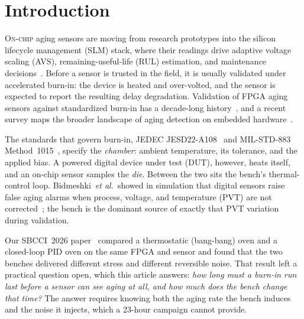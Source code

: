 \documentclass[10pt,twocolumn]{article}
\begin{document}
\section{Introduction}
\lettrine[lines=2,findent=1pt,nindent=0pt]{O}{n-chip} aging sensors are moving from research prototypes into the silicon lifecycle management (SLM) stack, where their readings drive adaptive voltage scaling (AVS), remaining-useful-life (RUL) estimation, and maintenance decisions~\cite{kashyap,niemann}. Before a sensor is trusted in the field, it is usually validated under accelerated burn-in: the device is heated and over-volted, and the sensor is expected to report the resulting delay degradation. Validation of FPGA aging sensors against standardized burn-in has a decade-long history~\cite{valdes}, and a recent survey maps the broader landscape of aging detection on embedded hardware~\cite{lanzieri}.

The standards that govern burn-in, JEDEC JESD22-A108~\cite{jedec} and MIL-STD-883 Method~1015~\cite{mil}, specify the \emph{chamber}: ambient temperature, its tolerance, and the applied bias. A powered digital device under test (DUT), however, heats itself, and an on-chip sensor samples the \emph{die}. Between the two sits the bench's thermal-control loop. Bidmeshki~\textit{et al.}\ showed in simulation that digital sensors raise false aging alarms when process, voltage, and temperature (PVT) are not corrected~\cite{bidmeshki}; the bench is the dominant source of exactly that PVT variation during validation.

Our SBCCI~2026 paper~\cite{sbcci26} compared a thermostatic (bang-bang) oven and a closed-loop PID oven on the same FPGA and sensor and found that the two benches delivered different stress and different reversible noise. That result left a practical question open, which this article answers: \emph{how long must a burn-in run last before a sensor can see aging at all, and how much does the bench change that time?} The answer requires knowing both the aging rate the bench induces and the noise it injects, which a 23-hour campaign cannot provide.
\end{document}
